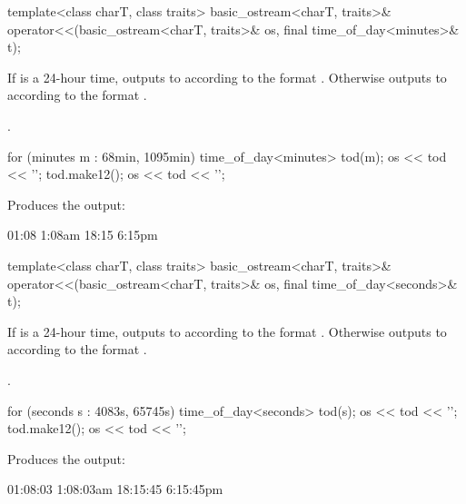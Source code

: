 %
\begin{itemdecl}
template<class charT, class traits>
  basic_ostream<charT, traits>&
    operator<<(basic_ostream<charT, traits>& os, final time_of_day<minutes>& t);
\end{itemdecl}

\begin{itemdescr}
\pnum
\effects
If  is a 24-hour time,
outputs to  according to the format
.
Otherwise
outputs to  according to the format
.

\pnum
\returns {}.

\begin{example}
\begin{codeblock}
for (minutes m : {68min, 1095min}) {
  time_of_day<minutes> tod(m);
  os << tod << '\n';
  tod.make12();
  os << tod << '\n';
}
\end{codeblock}

Produces the output:

\begin{codeblock}
01:08
1:08am
18:15
6:15pm
\end{codeblock}
\end{example}
\end{itemdescr}

%
\begin{itemdecl}
template<class charT, class traits>
  basic_ostream<charT, traits>&
    operator<<(basic_ostream<charT, traits>& os, final time_of_day<seconds>& t);
\end{itemdecl}

\begin{itemdescr}
\pnum
\effects
If  is a 24-hour time,
outputs to  according to the format
.
Otherwise
outputs to  according to the format
.

\pnum
\returns {}.

\begin{example}
\begin{codeblock}
for (seconds s : {4083s, 65745s}) {
  time_of_day<seconds> tod(s);
  os << tod << '\n';
  tod.make12();
  os << tod << '\n';
}
\end{codeblock}

Produces the output:

\begin{codeblock}
01:08:03
1:08:03am
18:15:45
6:15:45pm
\end{codeblock}
\end{example}
\end{itemdescr}

